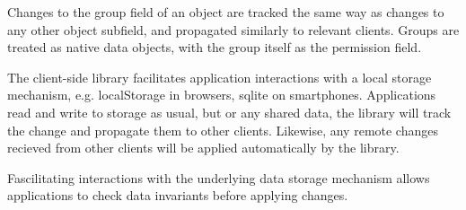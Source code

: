 
Changes to the group field of an object are tracked the same way as 
changes to any other object subfield, and propagated similarly to 
relevant clients. Groups are treated as \name{} native data objects,
with the group itself as the permission field.  


The \name{} client-side library facilitates application interactions with
a local storage mechanism, e.g. localStorage in browsers, sqlite on 
smartphones. Applications read and write to storage as usual, but or 
any shared data, the library will track the change and propagate them to
other clients. Likewise, any remote changes recieved from other clients
will be applied automatically by the library.

Fascilitating interactions with the underlying data storage mechanism
allows \name{} applications to check data invariants before applying 
changes.
 







